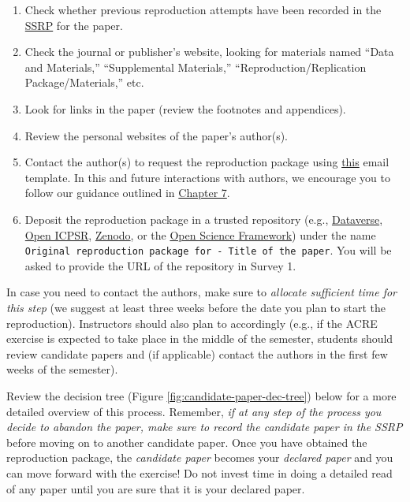 \documentclass[
  openany]{book}
\providecommand{\tightlist}{%
  \setlength{\itemsep}{0pt}\setlength{\parskip}{0pt}}
\begin{document}
\begin{enumerate}
\def\labelenumi{\arabic{enumi}.}
\tightlist
\item
  Check whether previous reproduction attempts have been recorded in the \href{https://www.socialsciencereproduction.org/}{SSRP} for the paper.
\item
  Check the journal or publisher's website, looking for materials named ``Data and Materials,'' ``Supplemental Materials,'' ``Reproduction/Replication Package/Materials,'' etc.\\
\item
  Look for links in the paper (review the footnotes and appendices).\\
\item
  Review the personal websites of the paper's author(s).
\item
  Contact the author(s) to request the reproduction package using \protect\hyperlink{contacting-the-original-authors-when-there-is-no-reproduction-package}{this} email template. In this and future interactions with authors, we encourage you to follow our guidance outlined in \protect\hyperlink{contacting-the-original-authors-when-there-is-no-reproduction-package}{Chapter 7}.
\item
  Deposit the reproduction package in a trusted repository (e.g., \href{https://dataverse.org/}{Dataverse}, \href{https://www.openicpsr.org/openicpsr/}{Open ICPSR}, \href{https://zenodo.org/}{Zenodo}, or the \href{https://osf.io/}{Open Science Framework}) under the name \texttt{Original\ reproduction\ package\ for\ -\ Title\ of\ the\ paper}. You will be asked to provide the URL of the repository in Survey 1.
\end{enumerate}

In case you need to contact the authors, make sure to \emph{allocate sufficient time for this step} (we suggest at least three weeks before the date you plan to start the reproduction). Instructors should also plan to accordingly (e.g., if the ACRE exercise is expected to take place in the middle of the semester, students should review candidate papers and (if applicable) contact the authors in the first few weeks of the semester).

Review the decision tree (Figure \ref{fig:candidate-paper-dec-tree}) below for a more detailed overview of this process. Remember, \emph{if at any step of the process you decide to abandon the paper, make sure to record the candidate paper in the SSRP} before moving on to another candidate paper. Once you have obtained the reproduction package, the \emph{candidate paper} becomes your \emph{declared paper} and you can move forward with the exercise! Do not invest time in doing a detailed read of any paper until you are sure that it is your declared paper.
\end{document}

